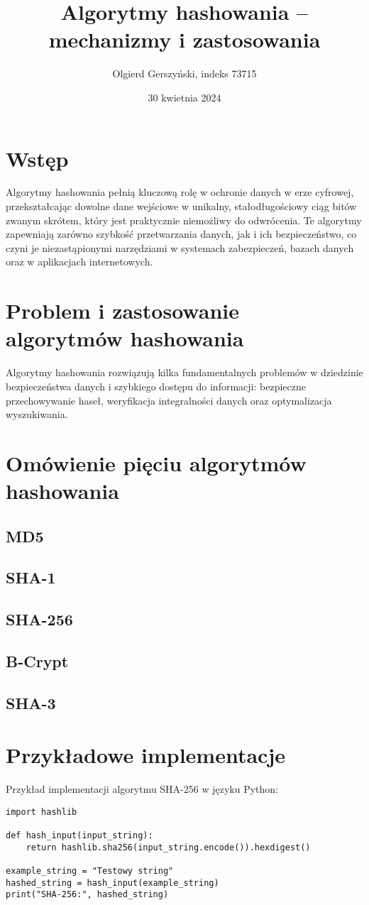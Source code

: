 \documentclass[12pt]{article}
\title{Algorytmy hashowania – mechanizmy i zastosowania}
\author{Olgierd Gerszyński, indeks 73715}
\date{30 kwietnia 2024}
\begin{document}
\maketitle

\section*{Wstęp}
Algorytmy hashowania pełnią kluczową rolę w ochronie danych w erze cyfrowej, przekształcając dowolne dane wejściowe w unikalny, stałodługościowy ciąg bitów zwanym skrótem, który jest praktycznie niemożliwy do odwrócenia. Te algorytmy zapewniają zarówno szybkość przetwarzania danych, jak i ich bezpieczeństwo, co czyni je niezastąpionymi narzędziami w systemach zabezpieczeń, bazach danych oraz w aplikacjach internetowych.

\section*{Problem i zastosowanie algorytmów hashowania}
Algorytmy hashowania rozwiązują kilka fundamentalnych problemów w dziedzinie bezpieczeństwa danych i szybkiego dostępu do informacji: bezpieczne przechowywanie haseł, weryfikacja integralności danych oraz optymalizacja wyszukiwania.

\section*{Omówienie pięciu algorytmów hashowania}
\subsection*{MD5}
\subsection*{SHA-1}
\subsection*{SHA-256}
\subsection*{B-Crypt}
\subsection*{SHA-3}

\section*{Przykładowe implementacje}
Przykład implementacji algorytmu SHA-256 w języku Python:
\begin{verbatim}
import hashlib

def hash_input(input_string):
    return hashlib.sha256(input_string.encode()).hexdigest()

example_string = "Testowy string"
hashed_string = hash_input(example_string)
print("SHA-256:", hashed_string)
\end{verbatim}
\end{document}
